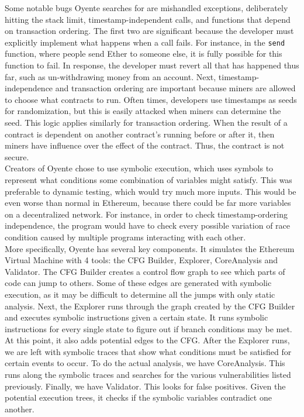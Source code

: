 Some notable bugs Oyente searches for are mishandled exceptions, deliberately hitting the stack limit, timestamp-independent calls, and functions that depend on transaction ordering. The first two are significant because the developer must explicitly implement what happens when a call fails. For instance, in the \texttt{send} function, where people send Ether to someone else, it is fully possible for this function to fail. In response, the developer must revert all that has happened thus far, such as un-withdrawing money from an account. Next, timestamp-independence and transaction ordering are important because miners are allowed to choose what contracts to run. Often times, developers use timestamps as seeds for randomization, but this is easily attacked when miners can determine the seed. This logic applies similarly for transaction ordering. When the result of a contract is dependent on another contract's running before or after it, then miners have influence over the effect of the contract. Thus, the contract is not secure.  \\

Creators of Oyente chose to use symbolic execution, which uses symbols to represent what conditions some combination of variables might satisfy. This was preferable to dynamic testing, which would try much more inputs. This would be even worse than normal in Ethereum, because there could be far more variables on a decentralized network. For instance, in order to check timestamp-ordering independence, the program would have to check every possible variation of race condition caused by multiple programs interacting with each other. \\

More specifically, Oyente has several key components. It simulates the Ethereum Virtual Machine with 4 tools: the CFG Builder, Explorer, CoreAnalysis and Validator. The CFG Builder creates a control flow graph to see which parts of code can jump to others. Some of these edges are generated with symbolic execution, as it may be difficult to determine all the jumps with only static analysis. Next, the Explorer runs through the graph created by the CFG Builder and executes symbolic instructions given a certain state. It runs symbolic instructions for every single state to figure out if branch conditions may be met. At this point, it also adds potential edges to the CFG. After the Explorer runs, we are left with symbolic traces that show what conditions must be satisfied for certain events to occur. To do the actual analysis, we have CoreAnalysis. This runs along the symbolic traces and searches for the various vulnerabilities listed previously. Finally, we have Validator. This looks for false positives. Given the potential execution trees, it checks if the symbolic variables contradict one another. \\


